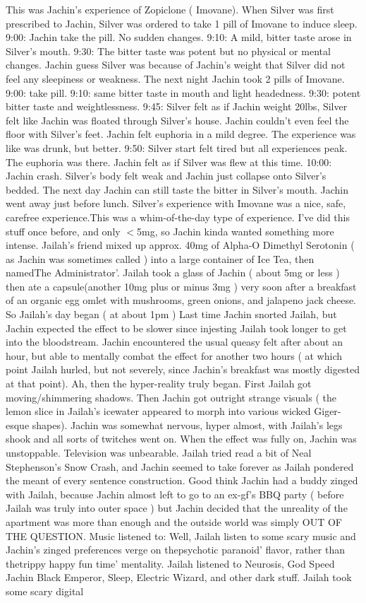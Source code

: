 \documentclass[12pt]{book}
\begin{document}
This was Jachin's experience of Zopiclone ( Imovane). When Silver was first prescribed to Jachin, Silver was ordered to take 1 pill of Imovane to induce sleep. 9:00: Jachin take the pill. No sudden changes. 9:10: A mild, bitter taste arose in Silver's mouth. 9:30: The bitter taste was potent but no physical or mental changes. Jachin guess Silver was because of Jachin's weight that Silver did not feel any sleepiness or weakness. The next night Jachin took 2 pills of Imovane. 9:00: take pill. 9:10: same bitter taste in mouth and light headedness. 9:30: potent bitter taste and weightlessness. 9:45: Silver felt as if Jachin weight 20lbs, Silver felt like Jachin was floated through Silver's house. Jachin couldn't even feel the floor with Silver's feet. Jachin felt euphoria in a mild degree. The experience was like was drunk, but better. 9:50: Silver start felt tired but all experiences peak. The euphoria was there. Jachin felt as if Silver was flew at this time. 10:00: Jachin crash. Silver's body felt weak and Jachin just collapse onto Silver's bedded. The next day Jachin can still taste the bitter in Silver's mouth. Jachin went away just before lunch. Silver's experience with Imovane was a nice, safe, carefree experience.This was a whim-of-the-day type of experience. I've did this stuff once before, and only $<$5mg, so Jachin kinda wanted something more intense. Jailah's friend mixed up approx. 40mg of Alpha-O Dimethyl Serotonin ( as Jachin was sometimes called ) into a large container of Ice Tea, then namedThe Administrator'. Jailah took a glass of Jachin ( about 5mg or less ) then ate a capsule(another 10mg plus or minus 3mg ) very soon after a breakfast of an organic egg omlet with mushrooms, green onions, and jalapeno jack cheese. So Jailah's day began ( at about 1pm ) Last time Jachin snorted Jailah, but Jachin expected the effect to be slower since injesting Jailah took longer to get into the bloodstream. Jachin encountered the usual queasy felt after about an hour, but able to mentally combat the effect for another two hours ( at which point Jailah hurled, but not severely, since Jachin's breakfast was mostly digested at that point). Ah, then the hyper-reality truly began. First Jailah got moving/shimmering shadows. Then Jachin got outright strange visuals ( the lemon slice in Jailah's icewater appeared to morph into various wicked Giger-esque shapes). Jachin was somewhat nervous, hyper almost, with Jailah's legs shook and all sorts of twitches went on. When the effect was fully on, Jachin was unstoppable. Television was unbearable. Jailah tried read a bit of Neal Stephenson's Snow Crash, and Jachin seemed to take forever as Jailah pondered the meant of every sentence construction. Good think Jachin had a buddy zinged with Jailah, because Jachin almost left to go to an ex-gf's BBQ party ( before Jailah was truly into outer space ) but Jachin decided that the unreality of the apartment was more than enough and the outside world was simply OUT OF THE QUESTION. Music listened to: Well, Jailah listen to some scary music and Jachin's zinged preferences verge on thepsychotic paranoid' flavor, rather than thetrippy happy fun time' mentality. Jailah listened to Neurosis, God Speed Jachin Black Emperor, Sleep, Electric Wizard, and other dark stuff. Jailah took some scary digital 
\end{document}
